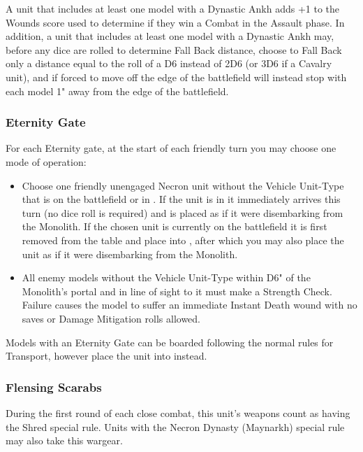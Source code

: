 A unit that includes at least one model with a Dynastic Ankh adds +1 to the Wounds score used to determine if they win a Combat in the Assault phase. In addition, a unit that includes at least one model with a Dynastic Ankh may, before any dice are rolled to determine Fall Back distance, choose to Fall Back only a distance equal to the roll of a D6 instead of 2D6 (or 3D6 if a Cavalry unit), and if forced to move off the edge of the battlefield will instead stop with each model 1" away from the edge of the battlefield.

\subsubsection{Eternity Gate} \label{Eternity Gate}

For each Eternity gate, at the start of each friendly turn you may choose one mode of operation:

\begin{itemize}
	\item Choose one friendly unengaged Necron unit without the Vehicle Unit-Type that is on the battlefield or in . If the unit is in  it immediately arrives this turn (no dice roll is required) and is placed as if it were disembarking from the Monolith. If the chosen unit is currently on the battlefield it is first removed from the table and place into , after which you may also place the unit as if it were disembarking from the Monolith.
	\item All enemy models without the Vehicle Unit-Type within D6" of the Monolith's portal and in line of sight to it must make a Strength Check. Failure causes the model to suffer an immediate Instant Death wound with no saves or Damage Mitigation rolls allowed.
\end{itemize}

Models with an Eternity Gate can be boarded following the normal rules for Transport, however place the unit into  instead.


\subsubsection{Flensing Scarabs} \label{Flensing Scarabs}

During the first round of each close combat, this unit's weapons count as having the Shred special rule. Units with the Necron Dynasty (Maynarkh) special rule may also take this wargear.

